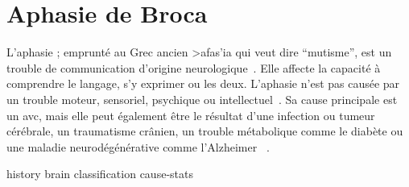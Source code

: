 \chapter{Aphasie de Broca}

L'aphasie ; emprunté au Grec ancien \textgreek{>afas'ia} qui veut dire ``mutisme'',
est un trouble de communication d'origine neurologique~\cite{Larousse}. 
Elle affecte la capacité à comprendre le langage, s'y exprimer ou les deux.
L'aphasie n'est pas causée par un trouble moteur, sensoriel, psychique ou intellectuel~\cite{Chapey_2008}.
Sa cause principale est un \Acrshort{avc}, 
mais elle peut également être le résultat d'une infection ou tumeur cérébrale, un traumatisme crânien, 
un trouble métabolique comme le diabète ou une maladie neurodégénérative comme l'Alzheimer ~\cite{Hallowell_2017}.

{history}
{brain}
{classification}
{cause-stats}
